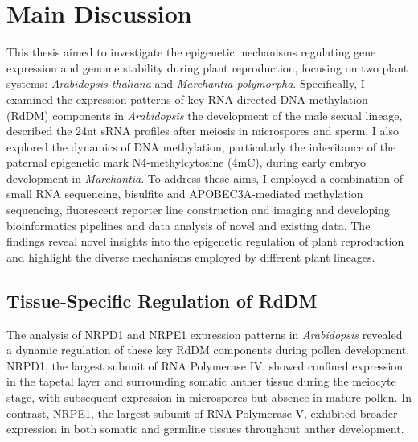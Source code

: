 \chapter{Main Discussion}

\ifpdf
    \graphicspath{{Chapter4/Figs/}}
\else
    \graphicspath{{Chapter3/Figs/}}
\fi


This thesis aimed to investigate the epigenetic mechanisms regulating gene expression and genome stability during plant reproduction, focusing on two plant systems: \textit{Arabidopsis thaliana} and \textit{Marchantia polymorpha}. Specifically, I examined the expression patterns of key RNA-directed DNA methylation (RdDM) components in \textit{Arabidopsis} the development of the male sexual lineage, described the 24nt sRNA profiles after meiosis in microspores and sperm. I also explored the dynamics of DNA methylation, particularly the inheritance of the paternal epigenetic mark N4-methylcytosine (4mC), during early embryo development in \textit{Marchantia}. To address these aims, I employed a combination of small RNA sequencing, bisulfite and APOBEC3A-mediated methylation sequencing,  fluorescent reporter line construction and imaging and developing bioinformatics pipelines and data analysis of novel and existing data. The findings reveal novel insights into the epigenetic regulation of plant reproduction and highlight the diverse mechanisms employed by different plant lineages.

\section{Tissue-Specific Regulation of RdDM}

The analysis of NRPD1 and NRPE1 expression patterns in \textit{Arabidopsis} revealed a dynamic regulation of these key RdDM components during pollen development. NRPD1, the largest subunit of RNA Polymerase IV, showed confined expression in the tapetal layer and surrounding somatic anther tissue during the meiocyte stage, with subsequent expression in microspores but absence in mature pollen. In contrast, NRPE1, the largest subunit of RNA Polymerase V, exhibited broader expression in both somatic and germline tissues throughout anther development. 

